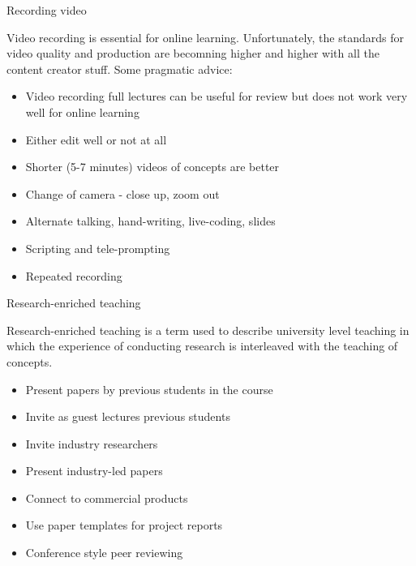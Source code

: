 \documentclass[12pt]{beamer}
\begin{document}
\begin{frame}{Recording video}

Video recording is essential for online learning. Unfortunately, the
standards for video quality and production are becomning higher and
higher with all the content creator stuff. Some pragmatic advice:

\begin{itemize}
\item{Video recording full lectures can be useful for review but
  does not work very well for online learning}
\item{Either edit well or not at all}
\item{Shorter (5-7 minutes) videos of concepts are better}
\item{Change of camera - close up, zoom out}
\item{Alternate talking, hand-writing, live-coding, slides}
\item{Scripting and tele-prompting}
\item{Repeated recording} 
\end{itemize} 
\end{frame}

\begin{frame}{Research-enriched teaching}

  Research-enriched teaching is a term used to describe
  university level teaching in which the experience of conducting research is
  interleaved with the teaching of concepts.

  \begin{itemize}
  \item{Present papers by previous students in the course}
  \item{Invite as guest lectures previous students}
  \item{Invite industry researchers}
  \item{Present industry-led papers}
  \item{Connect to commercial products}
  \item{Use paper templates for project reports}
  \item{Conference style peer reviewing} 
  \end{itemize} 
  
\end{frame} 
\end{document}

